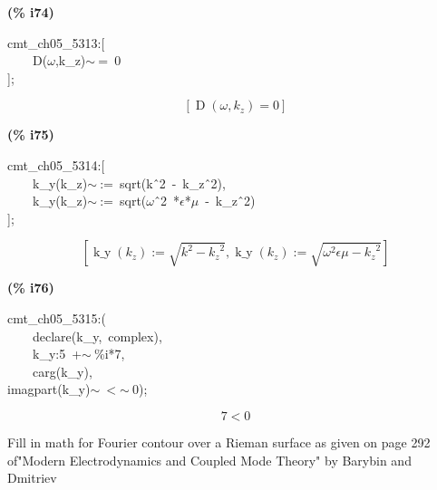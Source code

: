 \documentclass[fleqn]{article}
\begin{document}
\noindent
\begin{minipage}[t]{4.000000em}\color{red}\bfseries
(\% i74)	
\end{minipage}
\begin{minipage}[t]{\textwidth}\color{blue}
cmt\_ch05\_5313:[\\
\ \ \ \ D(\ensuremath{\omega},k\_z)\ensuremath{\sim\ }=\ 0\\
];
\end{minipage}
\[\displaystyle \tag{\% o74} 
\left[ \operatorname{D}\left( \omega \operatorname{,}{k_z}\right) =0\right] \mbox{}
\]


\noindent
\begin{minipage}[t]{4.000000em}\color{red}\bfseries
(\% i75)	
\end{minipage}
\begin{minipage}[t]{\textwidth}\color{blue}
cmt\_ch05\_5314:[\\
\ \ \ \ k\_y(k\_z)\ensuremath{\sim\ }:=\ sqrt(k\^\ 2\ -\ k\_z\^\ 2),\\
\ \ \ \ k\_y(k\_z)\ensuremath{\sim\ }:=\ sqrt(\ensuremath{\omega}\^\ 2\ *\ensuremath{\epsilon}*\ensuremath{\mu}\ -\ k\_z\^\ 2)\\
];
\end{minipage}
\[\displaystyle \tag{\% o75} 
\left[ \operatorname{k\_ y}\left( {k_z}\right) \operatorname{:=}\sqrt{{{k}^{2}}-{{{k_z}}^{2}}}\operatorname{,}\operatorname{k\_ y}\left( {k_z}\right) \operatorname{:=}\sqrt{{{\omega }^{2}} \epsilon  \mu -{{{k_z}}^{2}}}\right] \mbox{}
\]


\noindent
\begin{minipage}[t]{4.000000em}\color{red}\bfseries
(\% i76)	
\end{minipage}
\begin{minipage}[t]{\textwidth}\color{blue}
cmt\_ch05\_5315:(\\
\ \ \ \ declare(k\_y,\ complex),\\
\ \ \ \ k\_y:5\ +\ensuremath{\sim\ }\%i*7,\\
\ \ \ \ carg(k\_y),\\
imagpart(k\_y)\ensuremath{\sim\ }\ensuremath{<}\ensuremath{\sim\ }0);
\end{minipage}
\[\displaystyle \tag{\% o76} 
7\operatorname{<  }0\mbox{}
\]

Fill in math for Fourier contour over a Rieman surface as given on page 292 of"Modern Electrodynamics and Coupled Mode Theory" by Barybin and Dmitriev
\end{document}
